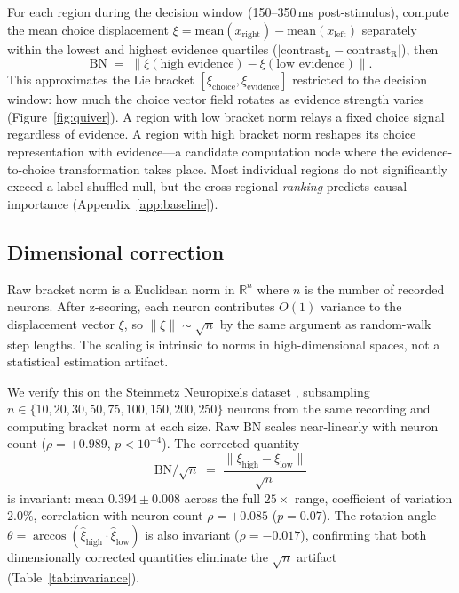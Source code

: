 \documentclass[9pt,lineno]{elife}
\begin{document}
For each region during the decision window (150--350\,ms post-stimulus), compute the mean choice displacement $\xi = \text{mean}(x_{\text{right}}) - \text{mean}(x_{\text{left}})$ separately within the lowest and highest evidence quartiles ($|\text{contrast}_{\text{L}} - \text{contrast}_{\text{R}}|$), then
\begin{equation}
\text{BN} \;=\; \bigl\lVert \xi(\text{high evidence}) - \xi(\text{low evidence}) \bigr\rVert .
\end{equation}
This approximates the Lie bracket $[\xi_{\text{choice}}, \xi_{\text{evidence}}]$ restricted to the decision window: how much the choice vector field rotates as evidence strength varies (Figure~\ref{fig:quiver}). A region with low bracket norm relays a fixed choice signal regardless of evidence. A region with high bracket norm reshapes its choice representation with evidence---a candidate computation node where the evidence-to-choice transformation takes place. Most individual regions do not significantly exceed a label-shuffled null, but the cross-regional \emph{ranking} predicts causal importance (Appendix~\ref{app:baseline}).

\subsection{Dimensional correction}
\label{sec:dim_correction}

Raw bracket norm is a Euclidean norm in $\mathbb{R}^n$ where $n$ is the number of recorded neurons. After z-scoring, each neuron contributes $O(1)$ variance to the displacement vector $\xi$, so $\lVert \xi \rVert \sim \sqrt{n}$ by the same argument as random-walk step lengths. The scaling is intrinsic to norms in high-dimensional spaces, not a statistical estimation artifact.

We verify this on the Steinmetz Neuropixels dataset \citep{dandi000017}, subsampling $n \in \{10, 20, 30, 50, 75, 100, 150, 200, 250\}$ neurons from the same recording and computing bracket norm at each size. Raw BN scales near-linearly with neuron count ($\rho = +0.989$, $p < 10^{-4}$). The corrected quantity
\begin{equation}
\text{BN}/\!\sqrt{n} \;=\; \frac{\bigl\lVert \xi_{\text{high}} - \xi_{\text{low}} \bigr\rVert}{\sqrt{n}}
\end{equation}
is invariant: mean $0.394 \pm 0.008$ across the full $25\times$ range, coefficient of variation $2.0\%$, correlation with neuron count $\rho = +0.085$ ($p = 0.07$). The rotation angle $\theta = \arccos(\hat{\xi}_{\text{high}} \cdot \hat{\xi}_{\text{low}})$ is also invariant ($\rho = -0.017$), confirming that both dimensionally corrected quantities eliminate the $\sqrt{n}$ artifact (Table~\ref{tab:invariance}).
\end{document}
